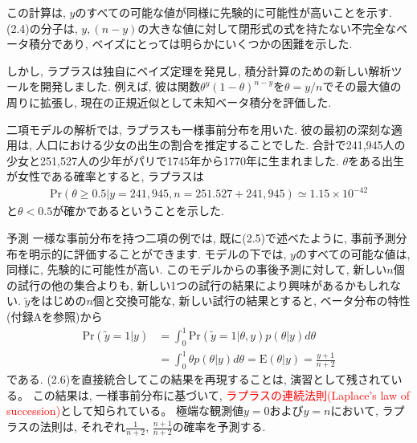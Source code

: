 \documentclass[10pt,dvipdfmx,a4]{beamer}
\newcommand{\eq}[1]{\begin{align}#1\end{align}}
\newcommand{\eqn}[1]{\begin{align*}#1\end{align*}}
\newcommand{\tcr}[1]{\textcolor{red}{#1}}
\begin{document}

\begin{frame}
この計算は, $y$のすべての可能な値が同様に先験的に可能性が高いことを示す.
(2.4)の分子は, $y, (n-y)$の大きな値に対して閉形式の式を持たない不完全なベータ積分であり, ベイズにとっては明らかにいくつかの困難を示した.

しかし, ラプラスは独自にベイズ定理を発見し, 積分計算のための新しい解析ツールを開発しました.
例えば, 彼は関数$\theta^y(1-\theta)^{n-y}$を$\theta=y/n$でその最大値の周りに拡張し, 現在の正規近似として未知ベータ積分を評価した.

二項モデルの解析では, ラプラスも一様事前分布を用いた.
彼の最初の深刻な適用は, 人口における少女の出生の割合を推定することでした.
合計で241,945人の少女と251,527人の少年がパリで1745年から1770年に生まれました.
$\theta$をある出生が女性である確率とすると, ラプラスは
\eqn{\text{Pr}(\theta\geq 0.5|y=241,945, n=251.527+241,945)\simeq 1.15\times 10^{-42}}
と$\theta<0.5$が確かであるということを示した.
\end{frame}


\begin{frame}{予測}
一様な事前分布を持つ二項の例では, 既に(2.5)で述べたように, 事前予測分布を明示的に評価することができます.
モデルの下では, $y$のすべての可能な値は, 同様に, 先験的に可能性が高い.
このモデルからの事後予測に対して, 新しい$n$個の試行の他の集合よりも, 新しい1つの試行の結果により興味があるかもしれない.
$\tilde{y}$をはじめの$n$個と交換可能な, 新しい試行の結果とすると, ベータ分布の特性(付録Aを参照)から
\eq{\text{Pr}(\tilde{y}=1|y)&=\int_0^1 \text{Pr}(\tilde{y}=1|\theta,y)p(\theta|y)d\theta\nonumber \\
&=\int_0^1 \theta p(\theta|y)d\theta=\text{E}(\theta|y)=\frac{y+1}{n+2}}
である.
(2.6)を直接統合してこの結果を再現することは, 演習として残されている。
この結果は, 一様事前分布に基づいて, \tcr{ラプラスの連続法則(Laplace's law of succession)}として知られている。
極端な観測値$y=0$および$y=n$において, ラプラスの法則は, それぞれ$\tfrac{1}{n+2}$, $\tfrac{n+1}{n+2}$の確率を予測する.
\end{frame}

\end{document}
